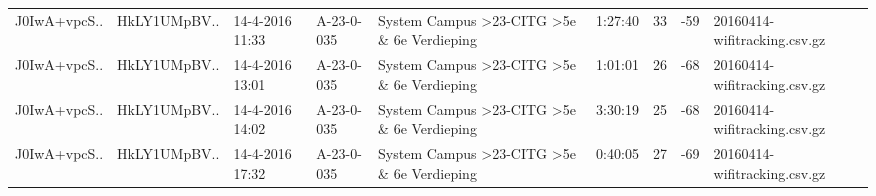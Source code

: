 \begin{table}[H]
\begin{tabular}{@{}lllllllll@{}}
		J0IwA+vpcS..      & HkLY1UMpBV.. & 14-4-2016 11:33  & A-23-0-035 & System Campus \textgreater 23-CITG \textgreater 5e \& 6e Verdieping & 1:27:40         & 33           & -59          & 20160414-wifitracking.csv.gz \\
		J0IwA+vpcS..      & HkLY1UMpBV.. & 14-4-2016 13:01  & A-23-0-035 & System Campus \textgreater 23-CITG \textgreater 5e \& 6e Verdieping & 1:01:01         & 26           & -68          & 20160414-wifitracking.csv.gz \\
		J0IwA+vpcS..      & HkLY1UMpBV.. & 14-4-2016 14:02  & A-23-0-035 & System Campus \textgreater 23-CITG \textgreater 5e \& 6e Verdieping & 3:30:19         & 25           & -68          & 20160414-wifitracking.csv.gz \\
		J0IwA+vpcS..      & HkLY1UMpBV.. & 14-4-2016 17:32  & A-23-0-035 & System Campus \textgreater 23-CITG \textgreater 5e \& 6e Verdieping & 0:40:05         & 27           & -69          & 20160414-wifitracking.csv.gz \\ \bottomrule
	\end{tabular}
\end{table}

